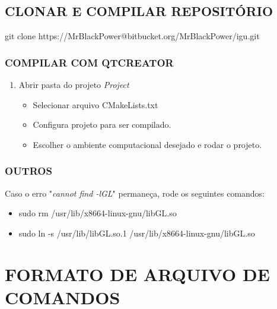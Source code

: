 \begin{appendices}
	\section{CLONAR E COMPILAR REPOSITÓRIO}\label{compile}
	
	git clone https://MrBlackPower@bitbucket.org/MrBlackPower/igu.git
	
	
	
	\subsection{COMPILAR COM QTCREATOR}\label{qtcreator}
	
	\begin{enumerate}
		\item Abrir pasta do projeto \textit{Project}
		\begin{itemize}
			\item Selecionar arquivo CMakeLists.txt
			\item Configura projeto para ser compilado.
			\item Escolher o ambiente computacional desejado e rodar o projeto.
		\end{itemize}
	\end{enumerate}
	
	\subsection{OUTROS}\label{cmake}
	
	Caso o erro "\textit{cannot find -lGL}" permaneça, rode os seguintes comandos:
	
	\begin{itemize}
		\item sudo rm /usr/lib/x86\underline{\space\space}64-linux-gnu/libGL.so
		\item sudo ln -s /usr/lib/libGL.so.1 /usr/lib/x86\underline{\space\space}64-linux-gnu/libGL.so
	\end{itemize}
	
	
	
	\chapter{FORMATO DE ARQUIVO DE COMANDOS}\label{annex2}
	

\end{appendices}
